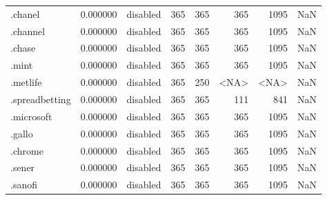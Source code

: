 \begin{tabular}{lrlrrrrl}
.chanel                   &          0.000000 &        disabled &                         365 &                         365 &                         365 &                1095 &                  NaN \\
.channel                  &          0.000000 &        disabled &                         365 &                         365 &                         365 &                1095 &                  NaN \\
.chase                    &          0.000000 &        disabled &                         365 &                         365 &                         365 &                1095 &                  NaN \\
.mint                     &          0.000000 &        disabled &                         365 &                         365 &                         365 &                1095 &                  NaN \\
.metlife                  &          0.000000 &        disabled &                         365 &                         250 &                        <NA> &                <NA> &                  NaN \\
.spreadbetting            &          0.000000 &        disabled &                         365 &                         365 &                         111 &                 841 &                  NaN \\
.microsoft                &          0.000000 &        disabled &                         365 &                         365 &                         365 &                1095 &                  NaN \\
.gallo                    &          0.000000 &        disabled &                         365 &                         365 &                         365 &                1095 &                  NaN \\
.chrome                   &          0.000000 &        disabled &                         365 &                         365 &                         365 &                1095 &                  NaN \\
.sener                    &          0.000000 &        disabled &                         365 &                         365 &                         365 &                1095 &                  NaN \\
.sanofi                   &          0.000000 &        disabled &                         365 &                         365 &                         365 &                1095 &                  NaN \\

\end{tabular}

